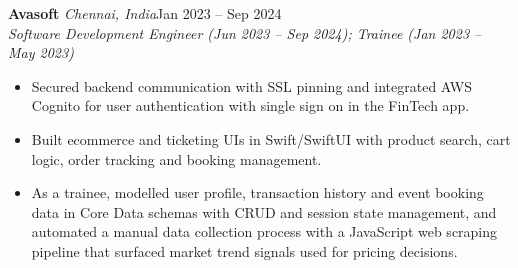 \documentclass[a4paper,11pt]{article}
\newcommand{\role}[4]{%
  \textbf{#1}{\color{muted}\,\textperiodcentered\,\textit{#2}}\hfill{\color{muted}#3}\\
  \textit{#4}\par}
\newcommand{\gap}{\vspace{5pt}}
\begin{document}
\gap
{}
\role{Avasoft}{Chennai, India}{Jan 2023 – Sep 2024}{Software Development Engineer (Jun 2023 – Sep 2024); Trainee (Jan 2023 – May 2023)}
\begin{itemize}
  \item Secured backend communication with SSL pinning and integrated AWS Cognito for user authentication with single sign on in the FinTech app.
  \item Built ecommerce and ticketing UIs in Swift/SwiftUI with product search, cart logic, order tracking and booking management.
  \item As a trainee, modelled user profile, transaction history and event booking data in Core Data schemas with CRUD and session state management, and automated a manual data collection process with a JavaScript web scraping pipeline that surfaced market trend signals used for pricing decisions.
\end{itemize}
\end{document}
